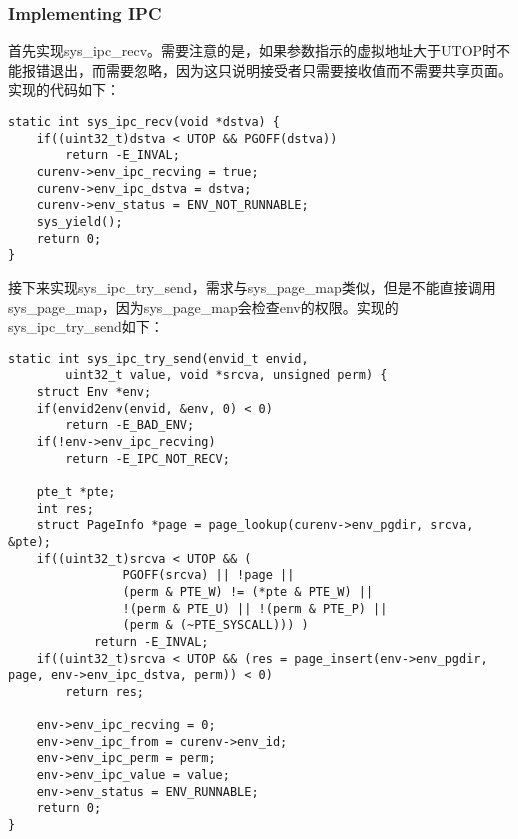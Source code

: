 \subsubsection{Implementing IPC}
\begin{exerciseSolution}{15}
    \par 首先实现sys\_ipc\_recv。需要注意的是，如果参数指示的虚拟地址大于UTOP时不能报错退出，而需要忽略，因为这只说明接受者只需要接收值而不需要共享页面。实现的代码如下：
    \begin{lstlisting}
static int sys_ipc_recv(void *dstva) {
    if((uint32_t)dstva < UTOP && PGOFF(dstva))
        return -E_INVAL;
    curenv->env_ipc_recving = true;
    curenv->env_ipc_dstva = dstva;
    curenv->env_status = ENV_NOT_RUNNABLE;
    sys_yield();
	return 0;
}
    \end{lstlisting}

    \par 接下来实现sys\_ipc\_try\_send，需求与sys\_page\_map类似，但是不能直接调用sys\_page\_map，因为sys\_page\_map会检查env的权限。实现的sys\_ipc\_try\_send如下：
    \begin{lstlisting}
static int sys_ipc_try_send(envid_t envid,
        uint32_t value, void *srcva, unsigned perm) {
    struct Env *env;
    if(envid2env(envid, &env, 0) < 0)
        return -E_BAD_ENV;
    if(!env->env_ipc_recving)
        return -E_IPC_NOT_RECV;

    pte_t *pte;
    int res;
    struct PageInfo *page = page_lookup(curenv->env_pgdir, srcva, &pte);
    if((uint32_t)srcva < UTOP && (
                PGOFF(srcva) || !page ||
                (perm & PTE_W) != (*pte & PTE_W) ||
                !(perm & PTE_U) || !(perm & PTE_P) ||
                (perm & (~PTE_SYSCALL))) )
            return -E_INVAL;
    if((uint32_t)srcva < UTOP && (res = page_insert(env->env_pgdir, page, env->env_ipc_dstva, perm)) < 0)
        return res;

    env->env_ipc_recving = 0;
    env->env_ipc_from = curenv->env_id;
	env->env_ipc_perm = perm;
	env->env_ipc_value = value;
	env->env_status = ENV_RUNNABLE;
    return 0;
}
    \end{lstlisting}


\end{exerciseSolution}
